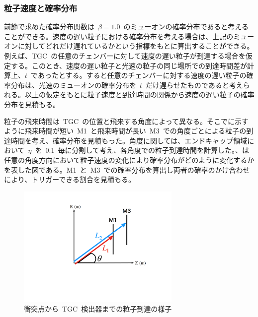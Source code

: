 \subsubsection{粒子速度と確率分布}\label{sec:prob}
前節で求めた確率分布関数は~$\beta=1.0$~のミューオンの確率分布であると考えることができる。速度の遅い粒子における確率分布を考える場合は、上記のミューオンに対してどれだけ遅れているかという指標をもとに算出することができる。例えば、TGC~の任意のチェンバーに対して速度の遅い粒子が到達する場合を仮定する。このとき、速度の遅い粒子と光速の粒子の同じ場所での到達時間差が計算上、$t$~であったとする。すると任意のチェンバーに対する速度の遅い粒子の確率分布は、光速のミューオンの確率分布を~$t$~だけ遅らせたものであると考えられる。以上の仮定をもとに粒子速度と到達時間の関係から速度の遅い粒子の確率分布を見積もる。

粒子の飛来時間は~TGC~の位置と飛来する角度によって異なる。そこでに示すように飛来時間が短い~M1~と飛来時間が長い~M3~での角度ごとによる粒子の到達時間を考え、確率分布を見積もった。角度に関しては、エンドキャップ領域において~$\eta$~を~0.1~毎に分割して考え、各角度での粒子到達時間を計算した。、は任意の角度方向において粒子速度の変化により確率分布がどのように変化するかを表した図である。M1~と~M3~での確率分布を算出し両者の確率のかけ合わせにより、トリガーできる割合を見積もる。
\begin{figure}[H]
    \centering   
    \includegraphics[width=0.7\textwidth,page=1]{img/slide/BX.pdf}
    \caption{衝突点から~TGC~検出器までの粒子到達の様子}\label{fig:velo}
\end{figure}

